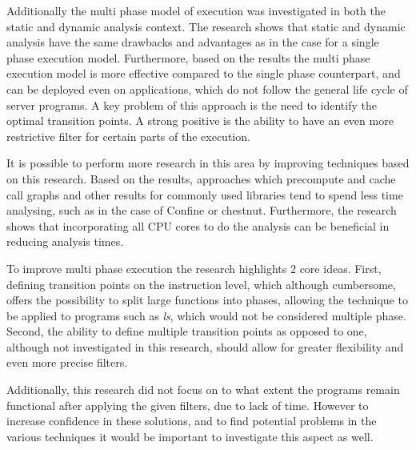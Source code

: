 Additionally the multi phase model of execution was investigated in both the static and dynamic analysis context.
The research shows that static and dynamic analysis have the same drawbacks and advantages as in the case for a single phase execution model.
Furthermore, based on the results the multi phase execution model is more effective compared to the single phase counterpart, and can be deployed even on applications, which do not follow the general life cycle of server programs.
A key problem of this approach is the need to identify the optimal transition points.
A strong positive is the ability to have an even more restrictive filter for certain parts of the execution.

It is possible to perform more research in this area by improving techniques based on this research.
Based on the results, approaches which precompute and cache call graphs and other results for commonly used libraries tend to spend less time analysing, such as in the case of Confine or chestnut.
Furthermore, the research shows that incorporating all CPU cores to do the analysis can be beneficial in reducing analysis times.

To improve multi phase execution the research highlights 2 core ideas.
First, defining transition points on the instruction level, which although cumbersome, offers the possibility to split large functions into phases, allowing the technique to be applied to programs such as \textit{ls}, which would not be considered multiple phase.
Second, the ability to define multiple transition points as opposed to one, although not investigated in this research, should allow for greater flexibility and even more precise filters.

Additionally, this research did not focus on to what extent the programs remain functional after applying the given filters, due to lack of time.
However to increase confidence in these solutions, and to find potential problems in the various techniques it would be important to investigate this aspect as well.
